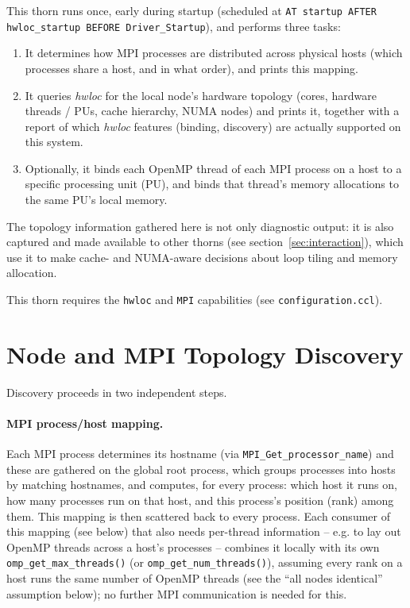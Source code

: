 This thorn runs once, early during startup (scheduled at
\texttt{AT startup AFTER hwloc\_startup BEFORE Driver\_Startup}), and
performs three tasks:
\begin{enumerate}
\item It determines how MPI processes are distributed across physical
  hosts (which processes share a host, and in what order), and prints
  this mapping.
\item It queries \emph{hwloc} for the local node's hardware topology
  (cores, hardware threads / PUs, cache hierarchy, NUMA nodes) and
  prints it, together with a report of which \emph{hwloc} features
  (binding, discovery) are actually supported on this system.
\item Optionally, it binds each OpenMP thread of each MPI process on a
  host to a specific processing unit (PU), and binds that thread's
  memory allocations to the same PU's local memory.
\end{enumerate}
The topology information gathered here is not only diagnostic output:
it is also captured and made available to other thorns (see
section~\ref{sec:interaction}), which use it to make cache- and
NUMA-aware decisions about loop tiling and memory allocation.

This thorn requires the \texttt{hwloc} and \texttt{MPI} capabilities
(see \texttt{configuration.ccl}).

\section{Node and MPI Topology Discovery}

Discovery proceeds in two independent steps.

\paragraph{MPI process/host mapping.} Each MPI process determines its
hostname (via \texttt{MPI\_Get\_processor\_name}) and these are
gathered on the global root process, which groups processes into
hosts by matching hostnames, and computes, for every process: which
host it runs on, how many processes run on that host, and this
process's position (rank) among them. This mapping is then scattered
back to every process. Each consumer of this mapping (see below) that
also needs per-thread information -- e.g. to lay out OpenMP threads
across a host's processes -- combines it locally with its own
\texttt{omp\_get\_max\_threads()} (or \texttt{omp\_get\_num\_threads()}),
assuming every rank on a host runs the same number of OpenMP threads
(see the ``all nodes identical'' assumption below); no further MPI
communication is needed for this.

